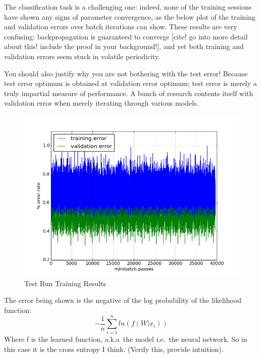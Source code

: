 \documentclass[a4paper,11pt]{article}
\begin{document}
The classification task is a challenging one: indeed, none of the training sessions have shown any signs of parameter convergence, as the below plot of the training and validation errors over batch iterations can show. These results are very confusing: backpropagation is guaranteed to converge [cite! go into more detail about this! include the proof in your background!], and yet both training and validation errors seem stuck in volatile periodicity.

You should also justify why you are not bothering with the test error! Because test error optimum is obtained at validation error optimum; test error is merely a truly impartial measure of performance. A bunch of research contents itself with validation error when merely iterating through various models. 

\begin{figure}[h!]
	\centering
	\includegraphics[scale=0.5]{images/test_run.png}
	\caption{Test Run Training Results}
\end{figure}

The error being shown is the negative of the log probability of the likelihood function:
\begin{equation}
-\frac{1}{n}\sum\limits_{i=1}^n ln(f(W|x_i))
\end{equation}
Where f is the learned function, a.k.a\ the model i.e.\ the neural network. So in this case it is the cross entropy I think. (Verify this, provide intuition).\\
\end{document}
